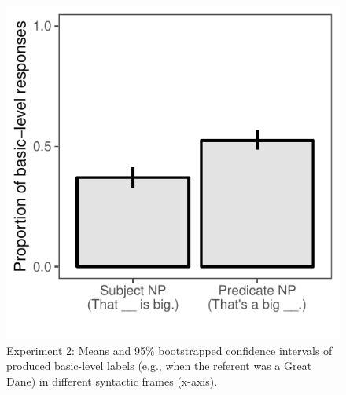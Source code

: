 \documentclass[10pt,letterpaper]{article}
\begin{document}
\begin{figure}[t]
\begin{center}
\includegraphics[width=0.7\linewidth]{expt-np-prod-prereg-bars.pdf}
\end{center}
\vspace{-1cm}
\caption{Experiment 2: Means and 95\% bootstrapped confidence intervals of produced basic-level labels (e.g.,  when the referent was a Great Dane) in different syntactic frames (x-axis).}
\label{np-production}
\vspace{-0.2cm}
\end{figure}
\end{document}
